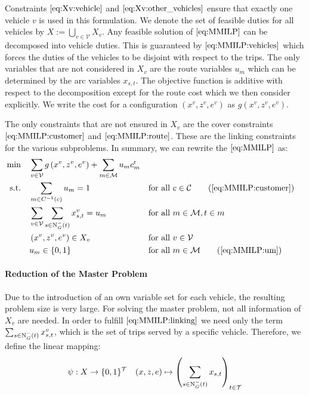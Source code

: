 Constraints $\eqref{eq:Xv:vehicle}$ and $\eqref{eq:Xv:other_vehicles}$ ensure that exactly one vehicle $v$ is used in this formulation. We denote the set of feasible duties for all vehicles by $X:=\bigcup_{v\in\mathcal{V}}X_v$. Any feasible solution of $\eqref{eq:MMILP}$ can be decomposed into vehicle duties. This is guaranteed by $\eqref{eq:MMILP:vehicles}$ which forces the duties of the vehicles to be disjoint with respect to the trips. The only variables that are not considered in $X_v$ are the route variables $u_m$ which can be determined by the arc variables $x_{s,t}$. The objective function is additive with respect to the decomposition except for the route cost which we then consider explicitly. We write the cost for a configuration $\left(x^v,z^v,e^v\right)$ as $g\left(x^v,z^v,e^v\right)$.

The only constraints that are not ensured in $X_v$ are the cover constraints $\eqref{eq:MMILP:customer}$ and $\eqref{eq:MMILP:route}$. These are the linking constraints for the various subproblems. In summary, we can rewrite the $\eqref{eq:MMILP}$ as:
\begin{align}
	\min \quad & \sum_{v\in\mathcal{V}}g\left(x^v,z^v,e^v\right) + \sum_{m\in\mathcal{M}} u_m \croute_m \nonumber \\
	\text{s.t.} \quad & \sum_{m\in C^{-1}(c)} u_m = 1 && \text{for all } c\in\mathcal{C} \tag{\ref{eq:MMILP:customer}} \\
	& \sum_{v\in\mathcal{V}}\sum_{s\in\Nin(t)}x^v_{s,t} = u_m && \text{for all } m\in\mathcal{M},t\in m \label{eq:MMILP:linking} \\
	& \left(x^v,z^v,e^v\right)\in X_v && \text{for all } v\in\mathcal{V} \nonumber \\
	& u_m\in\{0,1\} && \text{for all } m\in\mathcal{M} \tag{\ref{eq:MMILP:um}}
\end{align}

\paragraph{Reduction of the Master Problem} \parfill

Due to the introduction of an own variable set for each vehicle, the resulting problem size is very large. For solving the master problem, not all information of $X_v$ are needed. In order to fulfill $\eqref{eq:MMILP:linking}$ we need only the term ${\sum_{s\in\operatorname{N}_G^-(t)} x^v_{s,t}}$, which is the set of trips served by a specific vehicle. Therefore, we define the linear mapping: 
\begin{align*}
	\psi:X\to\{0,1\}^{\mathcal{T}} && (x,z,e)\mapsto\left(\sum_{s\in\operatorname{N}_G^-(t)}x_{s,t}\right)_{t\in\mathcal{T}} \label{eq:psi}
\end{align*}

